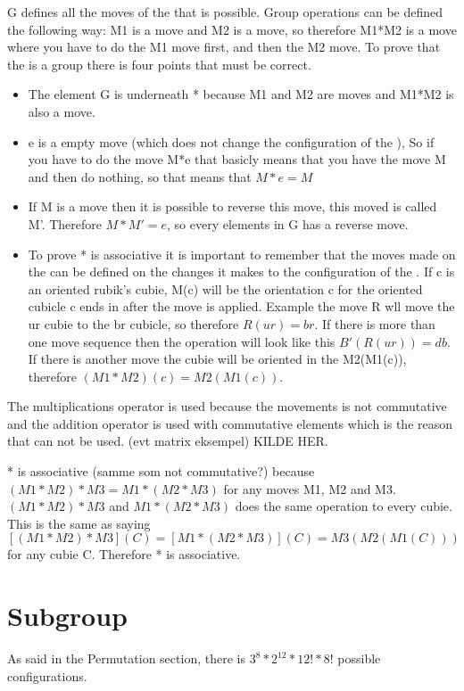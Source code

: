 G defines all the moves of the \rubik{} that is possible. Group operations can be defined the following way: M1 is a move and M2 is a move, so therefore M1*M2 is a move where you have to do the M1 move first, and then the M2 move. To prove that the \rubik{} is a group there is four points that must be correct.

\begin {itemize}
\item The element G is underneath * because M1 and M2 are moves  and M1*M2 is also a move.

\item e is a empty move (which does not change the configuration of the \rubik{}), So if you have to do the move M*e that basicly means that you have the move M and then do nothing, so that means that $M*e=M$

\item If M is a move then it is possible to reverse this move, this moved is called M'. Therefore $M*M' = e$, so every elements in G has a reverse move.

\item To prove * is associative it is important to remember that the moves made on the \rubik{} can be defined on the changes it makes to the configuration of the \rubik{}. 
If c is an oriented rubik's cubie, M(c) will be the orientation c for the oriented cubicle c ends in after the move is applied.
Example the move R wll move the ur cubie to the br cubicle, so therefore $R(ur)=br$. If there is more than one move sequence then the operation will look like this $B'(R(ur))=db$. If there is another move the cubie will be oriented in the M2(M1(c)), therefore $(M1*M2)(c)=M2(M1(c))$. 

\end {itemize}

The multiplications operator is used because the \rubik{} movements is not commutative and the addition operator is used with commutative elements which is the reason that can not be used. (evt matrix eksempel) KILDE HER.

* is associative (samme som not commutative?) because $(M1*M2)*M3 = M1*(M2*M3)$ for any moves M1, M2 and M3. $(M1*M2)*M3$ and $M1*(M2*M3)$ does the same operation to every cubie. This is the same as saying $[(M1*M2)*M3](C)=[M1*(M2*M3)](C)=M3(M2(M1(C)))$ for any cubie C. Therefore * is associative.

\section{Subgroup}
As said in the Permutation section, there is $3^8*2^{12}*12!*8!$ possible configurations.

\myTail{
}
%